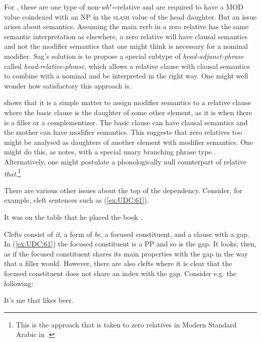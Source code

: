 \documentclass[output=paper
                ,modfonts
                ,nonflat
	        ,collection
	        ,collectionchapter
	        ,collectiontoclongg
 	        ,biblatex
                ,babelshorthands
                ,newtxmath
                ,draftmode
                ,colorlinks, citecolor=brown
]{./langsci/langscibook}
\begin{document}
{\noindent
For \citet{Sag:97}, these are one type of non-\emph{wh}"=relative and are
required to have a MOD value coindexed with an NP in the \textsc{slash} value of
the head daughter. But an issue arises about semantics. Assuming the
main verb in a zero relative has the same semantic interpretation as
elsewhere, a zero relative will have clausal semantics and not the
modifier semantics that one might think is necessary for a nominal
modifier. Sag's solution is to propose a special subtype of
\emph{head-adjunct-phrase} called \emph{head-relative-phrase}, which
allows a relative clause with clausal semantics to combine with a
nominal and be interpreted in the right way. One might well wonder how
satisfactory this approach is.

\citet{Sag:10a} shows that it is a simple matter to assign modifier semantics
to a relative clause where the basic clause is the daughter of some
other element, as it is when there is a filler or a complementizer. The
basic clause can have clausal semantics and the mother can have modifier
semantics. This suggests that zero relatives too might be analysed as
daughters of another element with modifier semantics. One might do this,
as \citet[531]{Sag:10a} notes, with a special unary branching phrase
type \citep[Section~10.3.2]{Mueller99a}.
Alternatively, one might postulate a phonologically null counterpart of
relative \emph{that}.\footnote{This is the approach that is taken to
  zero relatives in Modern Standard Arabic in \citet{Alqurashi:Borsley:12}.}

There are various other issues about the top of the dependency.
Consider, for example, cleft sentences such as (\ref{ex:UDC:61}).

\begin{exe}
\ex \label{ex:UDC:61}
 It was on the table that he placed the book \gap{}.
\end{exe}

\noindent
Clefts consist of \emph{it}, a form of \emph{be}, a focused constituent,
and a clause with a gap. In (\ref{ex:UDC:61}) the focused constituent is a PP and so
is the gap. It looks, then, as if the focused constituent shares its
main properties with the gap in the way that a filler would. However,
there are also clefts where it is clear that the focused constituent
does not share an index with the gap. Consider e.g. the following:

\begin{exe}
\ex \label{ex:UDC:62}
It's me that \gap{} likes beer.
\end{exe}

}
\end{document}
